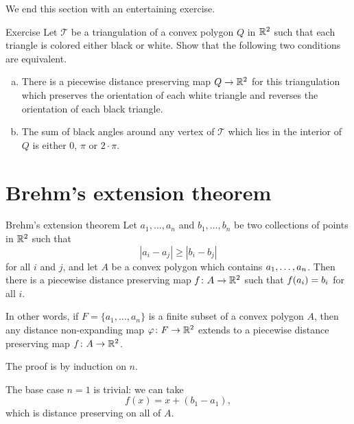 We end this section with an entertaining exercise.

\begin{thm}{Exercise}\label{ex:black-and-white}
Let $\mathcal{T}$ be a triangulation of a convex polygon $Q$ in $\mathbb{R}^2$ such that each triangle is colored either black or white.
Show that the following two conditions are equivalent.
\begin{enumerate}[a)]
\item There is a piecewise distance preserving map
$Q\to\mathbb{R}^2$ for this triangulation which preserves the orientation
of each white triangle
and reverses the orientation of each black triangle.

\item The sum of black angles around any vertex  of $\mathcal{T}$ 
which lies in the interior of $Q$
is either $0$, $\pi$ or $2\cdot\pi$.
\end{enumerate}

\end{thm}

\section{Brehm's extension theorem}


\begin{thm}{Brehm's extension theorem}\label{thm:brehm}
Let $a_1,\dots,a_n$ and $b_1,\dots,b_n$ be two collections of points in $\mathbb{R}^2$ such that 
$$|a_i-a_j|\ge |b_i-b_j|$$
for all $i$ and $j$,
and let $A$ be a convex polygon which contains $a_1,\z\dots,a_n$.
Then there is a piecewise distance preserving map $f\colon A\to \mathbb{R}^2$
such that
$f(a_i)\z=b_i$ for all $i$.
\end{thm}

In other words, if $F=\{a_1,\dots,a_n\}$ is a finite subset of a convex polygon $A$, then any distance non-expanding map $\varphi\colon F \to \mathbb{R}^2$ extends to a piecewise distance preserving map $f\colon A \to \mathbb{R}^2$.

The proof is by induction on $n$.

The base case $n=1$ is trivial:
we can take
$$f(x) = x + (b_1 - a_1),$$ which is distance preserving on all of $A$.

